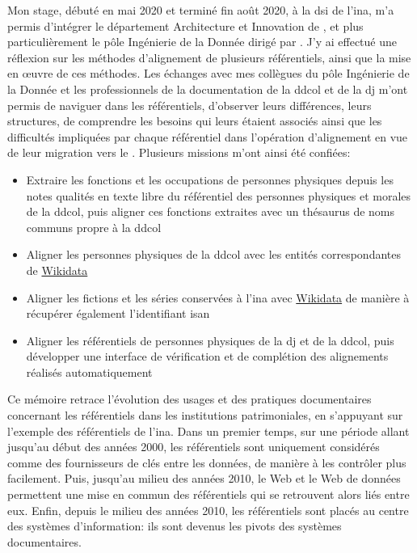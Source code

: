 Mon stage, débuté en mai 2020 et terminé fin août 2020, à la \ac{dsi} de l'\ac{ina}, m'a permis d'intégrer le département \og Architecture et Innovation\fg{} de , et plus particulièrement le pôle \og Ingénierie de la Donnée\fg{} dirigé par . J'y ai effectué une réflexion sur les méthodes d'alignement de plusieurs référentiels, ainsi que la mise en œuvre de ces méthodes. Les échanges avec mes collègues du pôle \og Ingénierie de la Donnée\fg{} et les professionnels de la documentation de la \ac{ddcol} et de la \ac{dj} m'ont permis de naviguer dans les référentiels, d'observer leurs différences, leurs structures, de comprendre les besoins qui leurs étaient associés ainsi que les difficultés impliquées par chaque référentiel dans l'opération d'alignement en vue de leur migration vers le \ldd. Plusieurs missions m'ont ainsi été confiées:
\begin{itemize}
	\item Extraire les fonctions et les occupations de personnes physiques depuis les notes qualités en texte libre du référentiel des personnes physiques et morales de la \ac{ddcol}, puis aligner ces fonctions extraites avec un thésaurus de noms communs propre à la \ac{ddcol}
	\item Aligner les personnes physiques de la \ac{ddcol} avec les entités correspondantes de \href{https://www.wikidata.org/}{Wikidata}
	\item Aligner les fictions et les séries conservées à l'\ac{ina} avec \href{https://www.wikidata.org/}{Wikidata} de manière à récupérer également l'identifiant \ac{isan}
	\item Aligner les référentiels de personnes physiques de la \ac{dj} et de la \ac{ddcol}, puis développer une interface de vérification et de complétion des alignements réalisés automatiquement
\end{itemize}
\bigskip

Ce mémoire retrace l'évolution des usages et des pratiques documentaires concernant les référentiels dans les institutions patrimoniales, en s'appuyant sur l'exemple des référentiels de l'\ac{ina}. Dans un premier temps, sur une période allant jusqu'au début des années 2000, les référentiels sont uniquement considérés comme des fournisseurs de clés entre les données, de manière à les contrôler plus facilement. Puis, jusqu'au milieu des années 2010, le Web et le Web de données permettent une mise en commun des référentiels qui se retrouvent alors liés entre eux. Enfin, depuis le milieu des années 2010, les référentiels sont placés au centre des systèmes d'information: ils sont devenus les pivots des systèmes documentaires.


\thispagestyle{empty}
\cleardoublepage